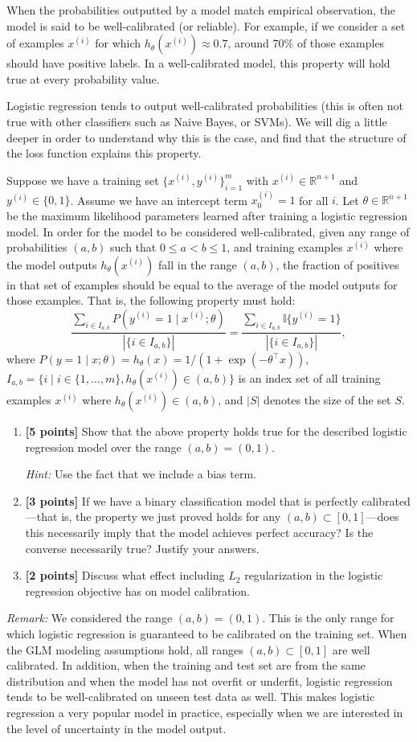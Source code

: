 \documentclass[11pt]{article}
\newcommand{\R}{\mathbb{R}}
\newcommand{\ind}{\mathbb{I}}
\begin{document}
When the probabilities outputted by a model match empirical observation, the model is said to be well-calibrated (or reliable). For example, if we consider a set of examples $x^{(i)}$ for which $h_\theta(x^{(i)})\approx0.7$, around 70\% of those examples should have positive labels. In a well-calibrated model, this property will hold true at every probability value.

Logistic regression tends to output well-calibrated probabilities (this is often not true with other classifiers such as Naive Bayes, or SVMs). We will dig a little deeper in order to understand why this is the case, and find that the structure of the loss function explains this property.

Suppose we have a training set $\{x^{(i)},y^{(i)}\}_{i=1}^m$ with $x^{(i)}\in\R^{n+1}$ and $y^{(i)}\in\{0,1\}$. Assume we have an intercept term $x_0^{(i)}=1$ for all $i$. Let $\theta\in\R^{n+1}$ be the maximum likelihood parameters learned after training a logistic regression model. In order for the model to be considered well-calibrated, given any range of probabilities $(a,b)$ such that $0\leq a<b\leq1$, and training examples $x^{(i)}$ where the model outputs $h_\theta(x^{(i)})$ fall in the range $(a,b)$, the fraction of positives in that set of examples should be equal to the average of the model outputs for those examples. That is, the following property must hold:
\[
\frac{\sum_{i\in I_{a,b}}P\!\left(y^{(i)}=1\mid x^{(i)};\theta\right)}{|\{i\in I_{a,b}\}|}
=\frac{\sum_{i\in I_{a,b}}\ind\{y^{(i)}=1\}}{|\{i\in I_{a,b}\}|},
\]
where $P(y=1\mid x;\theta)=h_\theta(x)=1/(1+\exp(-\theta^\top x))$, $I_{a,b}=\{i\mid i\in\{1,\ldots,m\},h_\theta(x^{(i)})\in(a,b)\}$ is an index set of all training examples $x^{(i)}$ where $h_\theta(x^{(i)})\in(a,b)$, and $|S|$ denotes the size of the set $S$.
\begin{enumerate}
\item \textbf{[5 points]} Show that the above property holds true for the described logistic regression model over the range $(a,b)=(0,1)$.

\textit{Hint:} Use the fact that we include a bias term.
\item \textbf{[3 points]} If we have a binary classification model that is perfectly calibrated---that is, the property we just proved holds for any $(a,b)\subset[0,1]$---does this necessarily imply that the model achieves perfect accuracy? Is the converse necessarily true? Justify your answers.
\item \textbf{[2 points]} Discuss what effect including $L_2$ regularization in the logistic regression objective has on model calibration.
\end{enumerate}
\textit{Remark:} We considered the range $(a,b)=(0,1)$. This is the only range for which logistic regression is guaranteed to be calibrated on the training set. When the GLM modeling assumptions hold, all ranges $(a,b)\subset[0,1]$ are well calibrated. In addition, when the training and test set are from the same distribution and when the model has not overfit or underfit, logistic regression tends to be well-calibrated on unseen test data as well. This makes logistic regression a very popular model in practice, especially when we are interested in the level of uncertainty in the model output.
\end{document}
